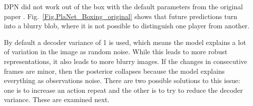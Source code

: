 DPN did not work out of the box with the default parameters from the original paper \cite{Algo.PlaNet}. Fig.~\ref{Fig.PlaNet_Boxing_original} shows that future predictions turn into a blurry blob, where it is not possible to distinguish one player from another.

By default a decoder variance of 1 is used, which means the model explains a lot of variation in the image as random noise. While this leads to more robust representations, it also leads to more blurry images. If the changes in consecutive frames are minor, then the posterior collapses because the model explains everything as observations noise. There are two possible solutions to this issue: one is to increase an action repeat and the other is to try to reduce the decoder variance. These are examined next.

\begin{figure}[H]

\end{figure}

